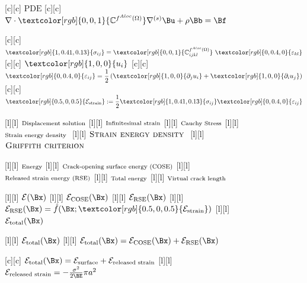 \begin{figure}[H]
	\centering
	\footnotesize

	[c] {$\text{PDE}$}
	[c] {$\mathbf{\nabla}\cdot\textcolor[rgb]{0,0,1}{\mathbb{C}^{f^{Aloc}(\Omega)}}\mathbf{\nabla}^{(s)} \Bu + \rho \Bb = \Bf$}

	[c] {$\textcolor[rgb]{1,0.41,0.13}{\sigma_{ij}} = \textcolor[rgb]{0,0,1}{\mathbb{C}_{ijkl}^{f^{Aloc}(\Omega)}}\
		\textcolor[rgb]{0,0.4,0}{\varepsilon_{kl}}$}
	[c][c] {$\textcolor[rgb]{1,0,0}{u_{i}}$}
	[c][c] {$\displaystyle \textcolor[rgb]{0,0.4,0}{\varepsilon_{ij}} 
	        = \frac{1}{2}\left(\textcolor[rgb]{1,0,0}{\partial_{j}u_{i}} +
			\textcolor[rgb]{1,0,0}{\partial_{i}u_{j}}\right)$}
	[c][c] {$\displaystyle \textcolor[rgb]{0.5,0,0.5}{\mathcal{E}_{\text{strain}} }:=
		\frac{1}{2}\textcolor[rgb]{1,0.41,0.13}{\sigma_{ij}}\textcolor[rgb]{0,0.4,0}{\varepsilon_{ij}}$}

	[l][l] {$\text{\scriptsize Displacement solution}$}
	[l][l] {$\text{\scriptsize Infinitesimal strain}$}
	[l][l] {$\text{\scriptsize Cauchy Stress}$}
	[l][l] {$\text{\scriptsize Strain energy density }$}
	[l][l] {$\textsc{Strain energy density }$}
	[l][l] {$\textsc{Griffith criterion}$}

	[l][l] {$\text{\scriptsize Energy}$}
	[l][l] {$\text{\scriptsize Crack-opening surface energy (COSE)}$}
	\psfrag{tser}[l][l] {$\text{\scriptsize Released strain energy (RSE)}$}
	\psfrag{tote}[l][l] {$\text{\scriptsize Total energy}$}
	[l][l] {$\text{\scriptsize Virtual crack length}$}

	[l][l] {$\mathcal{E}(\Bx)$}
	[l][l] {$\mathcal{E}_{\text{COSE}}(\Bx)$}
	[l][l] {$\mathcal{E}_{\text{RSE}}(\Bx)$}
	[l][l] {$\mathcal{E}_{\text{RSE}}(\Bx) = \hat{f}(\Bx;\textcolor[rgb]{0.5,0,0.5}{\mathcal{E}_{\text{strain}}})$}
	\psfrag{etot}[l][l] {$\mathcal{E}_{\text{total}}(\Bx)$}

	[l][l] {$\mathcal{E}_{\text{total}}(\Bx)$}
	[l][l] {$\mathcal{E}_{\text{total}}(\Bx) = \mathcal{E}_{\text{COSE}}(\Bx) + \mathcal{E}_{\text{RSE}}(\Bx)$}

	[c][c] {$\mathcal{E}_{\text{total}}(\Bx) = \mathcal{E}_{\text{surface}} + \mathcal{E}_{\text{released strain}}$}
	\psfrag{ets}[l][l] {$\mathcal{E}_{\text{released strain}} = -\frac{\sigma^2}{2\BE}\pi a^2$}


\end{figure}
